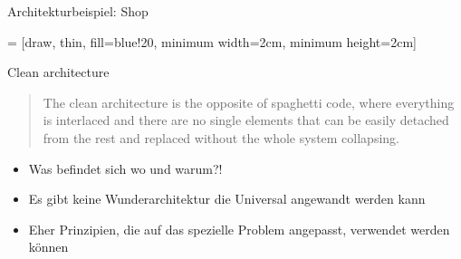 \documentclass{beamer}
\begin{document}
\begin{frame}{Architekturbeispiel: Shop}



 = [draw, thin, fill=blue!20, minimum width=2cm, minimum height=2cm]

\begin{figure}

\end{figure}


\end{frame}


\begin{frame}{Clean architecture}
 \begin{quote}
  
The clean architecture is the opposite of spaghetti code, where everything is interlaced and there
are no single elements that can be easily detached from the rest and replaced without the whole
system collapsing.
 \end{quote}
 
 \begin{itemize}
  \item Was befindet sich wo und warum?!
  \item Es gibt keine Wunderarchitektur die Universal angewandt werden kann
  \item Eher Prinzipien, die auf das spezielle Problem angepasst, verwendet werden können
 \end{itemize}

\end{frame}
\end{document}
